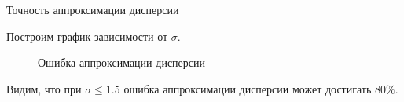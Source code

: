 \documentclass[ucs, notheorems, handout]{beamer}
\begin{document}
\begin{frame}{Точность аппроксимации дисперсии}
	
Построим график зависимости от $\sigma$.

\begin{figure}[h]
	\begin{minipage}[h]{0.4\linewidth}
	\end{minipage}
	\hfill
	\begin{minipage}[h]{0.4\linewidth}
	\end{minipage}
	\caption{Ошибка аппроксимации дисперсии}
	\label{figCurves}
\end{figure}

Видим, что при $\sigma\leq1.5$ ошибка аппроксимации дисперсии может достигать $80\%$. 
	
\end{frame}
	
\end{document}
